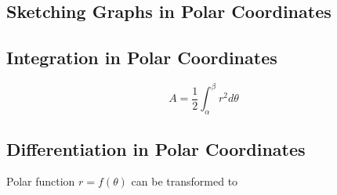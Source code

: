 \documentclass[a4paper,9pt]{scrartcl}
\begin{document}
    \subsection{Sketching Graphs in Polar Coordinates}
%
%

    \subsection{Integration in Polar Coordinates}

    \begin{displaymath}
        A = \frac{1}{2}\int_{\alpha}^{\beta} r^2 d\theta
    \end{displaymath}

    \subsection{Differentiation in Polar Coordinates}

    Polar function $r = f(\theta)$ can be transformed to
\end{document}
